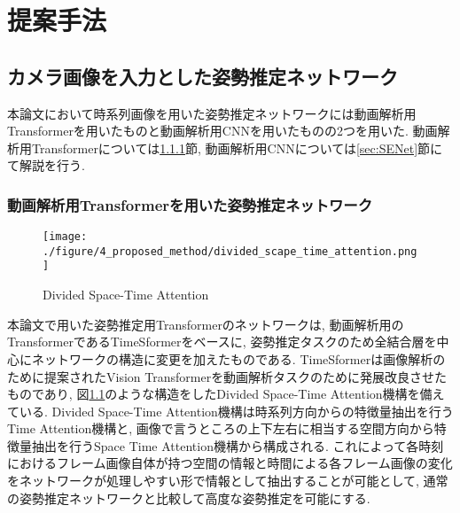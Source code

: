 \chapter{提案手法}

\section{カメラ画像を入力とした姿勢推定ネットワーク}\label{sec:Camera_DNN_Estimation}
本論文において時系列画像を用いた姿勢推定ネットワークには動画解析用Transformerを用いたものと動画解析用CNNを用いたものの2つを用いた. 動画解析用Transformerについては\ref{sec:TimeSformer}節, 動画解析用CNNについては\ref{sec:SENet}節にて解説を行う.


\subsection{動画解析用Transformerを用いた姿勢推定ネットワーク}\label{sec:TimeSformer}

\begin{figure}[thpb]
  \begin{minipage}[htpb]{1.0\hsize}
  \begin{center}
  \texttt{[image: ./figure/4\_proposed\_method/divided\_scape\_time\_attention.png]}
  \caption{Divided Space-Time Attention}
  \label{fig:Divided_Space_Time_Attention}
  \end{center}
  \end{minipage}
\end{figure}

本論文で用いた姿勢推定用Transformerのネットワークは, 動画解析用のTransformerであるTimeSformer\cite{TimeSformer_paper}をベースに, 姿勢推定タスクのため全結合層を中心にネットワークの構造に変更を加えたものである\cite{Kawai_SI2022}. TimeSformerは画像解析のために提案されたVision Transformer\cite{ViT_paper}を動画解析タスクのために発展改良させたものであり, 図\ref{fig:Divided_Space_Time_Attention}のような構造をしたDivided Space-Time Attention機構を備えている. Divided Space-Time Attention機構は時系列方向からの特徴量抽出を行うTime Attention機構と, 画像で言うところの上下左右に相当する空間方向から特徴量抽出を行うSpace Time Attention機構から構成される. これによって各時刻におけるフレーム画像自体が持つ空間の情報と時間による各フレーム画像の変化をネットワークが処理しやすい形で情報として抽出することが可能として, 通常の姿勢推定ネットワークと比較して高度な姿勢推定を可能にする.

